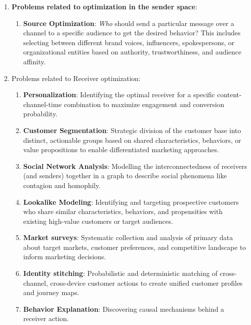 \begin{enumerate}
\item \textbf{Problems related to optimization in the sender space}:
    \begin{enumerate}
        \item \textbf{Source Optimization}: \textit{Who} should send a particular message over a channel to a specific audience to get the desired behavior? This includes selecting between different brand voices, influencers, spokespersons, or organizational entities based on authority, trustworthiness, and audience affinity.
    \end{enumerate}
    

\item Problems related to Receiver optimization:
    \begin{enumerate}
        \item \textbf{Personalization}: Identifying the optimal receiver for a specific content-channel-time combination to maximize engagement and conversion probability.
        \item \textbf{Customer Segmentation}: Strategic division of the customer base into distinct, actionable groups based on shared characteristics, behaviors, or value propositions to enable differentiated marketing approaches.
        \item \textbf{Social Network Analysis}: Modelling the interconnectedness of receivers (and senders) together in a graph to describe social phenomena like contagion and homophily.
        \item \textbf{Lookalike Modeling}:  Identifying and targeting prospective customers who share similar characteristics, behaviors, and propensities with existing high-value customers or target audiences.
        \item \textbf{Market surveys}: Systematic collection and analysis of primary data about target markets, customer preferences, and competitive landscape to inform marketing decisions.
        \item \textbf{Identity stitching}: Probabilistic and deterministic matching of cross-channel, cross-device customer actions to create unified customer profiles and journey maps.
        \item \textbf{Behavior Explanation}: Discovering causal mechanisms behind a receiver action.
    \end{enumerate}
    

\end{enumerate}
